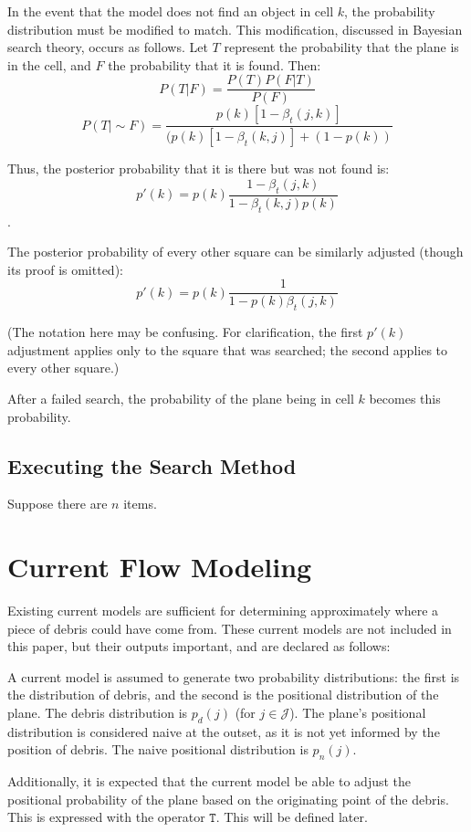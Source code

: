 \documentclass[a4paper,twocolumns]{article}
\begin{document}
\begin{multicols}{2}
In the event that the model does not find an object in cell $k$, the probability distribution must be modified to match. This modification, discussed in Bayesian search theory, occurs as follows. Let $T$ represent the probability that the plane is in the cell, and $F$ the probability that it is found. Then: 
$$P(T|F)=\frac{P(T)P(F|T)}{P(F)}$$ 
$$P(T|\sim F)=\frac{p(k)[1-\beta_t(j,k)]}{(p(k)[1-\beta_t(k,j)]+(1-p(k))}$$

Thus, the posterior probability that it is there but was not found is: $$p'(k)=p(k)\frac{1-\beta_t(j,k)}{1-\beta_t(k,j)p(k)}$$.

The posterior probability of every other square can be similarly adjusted (though its proof is omitted): $$p'(k)=p(k)\frac{1}{1-p(k)\beta_t(j,k)}$$

(The notation here may be confusing. For clarification, the first $p'(k)$ adjustment applies only to the square that was searched; the second applies to every other square.)

After a failed search, the probability of the plane being in cell $k$ becomes this probability.

\subsection{Executing the Search Method}

Suppose there are $n$ items. 

\section{Current Flow Modeling}

Existing current models are sufficient for determining approximately where a piece of debris could have come from. These current models are not included in this paper, but their outputs important, and are declared as follows:

A current model is assumed to generate two probability distributions: the first is the distribution of debris, and the second is the positional distribution of the plane. The debris distribution is $p_d(j)$ (for $j\in\mathcal{J}$). The plane's positional distribution is considered naive at the outset, as it is not yet informed by the position of debris. The naive positional distribution is $p_n(j)$. 

Additionally, it is expected that the current model be able to adjust the positional probability of the plane based on the originating point of the debris. This is expressed with the operator $\mathtt{T}$. This will be defined later. 


\end{multicols}
\end{document}
